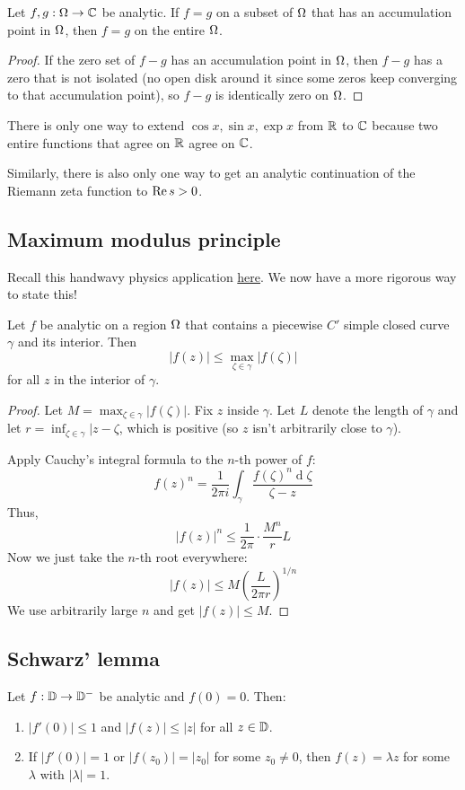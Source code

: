 \documentclass[12pt]{article}
\renewcommand{\d}{\ensuremath{\operatorname{d}}}
\begin{document}
\begin{theorem}
    Let $f,g:\Omega\to \mathbb{C}$ be analytic. If $f=g$ on a subset of $\Omega$ that has an accumulation point in $\Omega$, then $f=g$ on the entire $\Omega$.
\end{theorem}
\begin{proof}
    If the zero set of $f-g$ has an accumulation point in $\Omega$, then $f-g$ has a zero that is not isolated (no open disk around it since some zeros keep converging to that accumulation point), so $f-g$ is identically zero on $\Omega$.
\end{proof}

\eg There is only one way to extend $\cos x, \sin x, \exp x$ from $\mathbb{R}$ to $\mathbb{C}$ because two entire functions that agree on $\mathbb{R}$ agree on $\mathbb{C}$. 

\eg Similarly, there is also only one way to get an analytic continuation of the Riemann zeta function to $\operatorname{Re} s>0$. 

\subsection{Maximum modulus principle}
Recall this handwavy physics application \hyperlink{physics}{here}. We now have a more rigorous way to state this!

\begin{theorem}
    Let $f$ be analytic on a region $\Omega$ that contains a piecewise $C'$ simple closed curve $\gamma$ and its interior. Then \[|f(z)|\leq \max_{\zeta\in \gamma}|f(\zeta)|\] for all $z$ in the interior of $\gamma$.
\end{theorem}
\begin{proof}
    Let $M= \max_{\zeta\in \gamma}|f(\zeta)|$. Fix $z$ inside $\gamma$. Let $L$ denote the length of $\gamma$ and let $r=\inf_{\zeta\in \gamma}|z-\zeta$, which is positive (so $z$ isn't arbitrarily close to $\gamma$). 

    Apply Cauchy's integral formula to the $n$-th power of $f$: \[f(z)^n = \frac{1}{2\pi i}\int_{\gamma}\frac{f(\zeta)^n\d\zeta}{\zeta-z}\]
    Thus, \[|f(z)|^n \leq \frac{1}{2\pi}\cdot \frac{M^n}{r}L\]
    Now we just take the $n$-th root everywhere:\[|f(z)|\leq M\left(\frac{L}{2\pi r}\right)^{1/n}\] We use arbitrarily large $n$ and get $|f(z)|\leq M$.
\end{proof}

\subsection{Schwarz' lemma}
\begin{lemma}[Schwarz']
    Let $f:\mathbb{D}\to \mathbb{D}^-$ be analytic and $f(0)=0$. Then: \begin{enumerate}[label=(\alph*)]
        \item \(|f'(0)|\leq 1\) and $|f(z)|\leq |z|$ for all $z\in \mathbb{D}$.
        \item If $|f'(0)|=1$ or $|f(z_0)|=|z_0|$ for some $z_0\neq 0$, then $f(z)=\lambda z$ for some $\lambda$ with $|\lambda|=1$.
    \end{enumerate}
\end{lemma}
\end{document}
